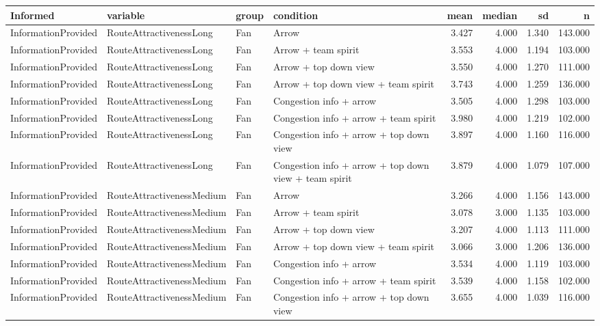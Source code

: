 \begin{tabular}{llllrrrr}
  \hline
Informed & variable & group & condition & mean & median & sd & n \\ 
  \hline
InformationProvided & RouteAttractivenessLong & Fan & Arrow & 3.427 & 4.000 & 1.340 & 143.000 \\ 
  InformationProvided & RouteAttractivenessLong & Fan & Arrow + team spirit & 3.553 & 4.000 & 1.194 & 103.000 \\ 
  InformationProvided & RouteAttractivenessLong & Fan & Arrow + top down view & 3.550 & 4.000 & 1.270 & 111.000 \\ 
  InformationProvided & RouteAttractivenessLong & Fan & Arrow + top down view + team spirit & 3.743 & 4.000 & 1.259 & 136.000 \\ 
  InformationProvided & RouteAttractivenessLong & Fan & Congestion info + arrow & 3.505 & 4.000 & 1.298 & 103.000 \\ 
  InformationProvided & RouteAttractivenessLong & Fan & Congestion info + arrow + team spirit & 3.980 & 4.000 & 1.219 & 102.000 \\ 
  InformationProvided & RouteAttractivenessLong & Fan & Congestion info + arrow + top down view & 3.897 & 4.000 & 1.160 & 116.000 \\ 
  InformationProvided & RouteAttractivenessLong & Fan & Congestion info + arrow + top down view + team spirit & 3.879 & 4.000 & 1.079 & 107.000 \\ 
  InformationProvided & RouteAttractivenessMedium & Fan & Arrow & 3.266 & 4.000 & 1.156 & 143.000 \\ 
  InformationProvided & RouteAttractivenessMedium & Fan & Arrow + team spirit & 3.078 & 3.000 & 1.135 & 103.000 \\ 
  InformationProvided & RouteAttractivenessMedium & Fan & Arrow + top down view & 3.207 & 4.000 & 1.113 & 111.000 \\ 
  InformationProvided & RouteAttractivenessMedium & Fan & Arrow + top down view + team spirit & 3.066 & 3.000 & 1.206 & 136.000 \\ 
  InformationProvided & RouteAttractivenessMedium & Fan & Congestion info + arrow & 3.534 & 4.000 & 1.119 & 103.000 \\ 
  InformationProvided & RouteAttractivenessMedium & Fan & Congestion info + arrow + team spirit & 3.539 & 4.000 & 1.158 & 102.000 \\ 
  InformationProvided & RouteAttractivenessMedium & Fan & Congestion info + arrow + top down view & 3.655 & 4.000 & 1.039 & 116.000 \\ 

\end{tabular}
